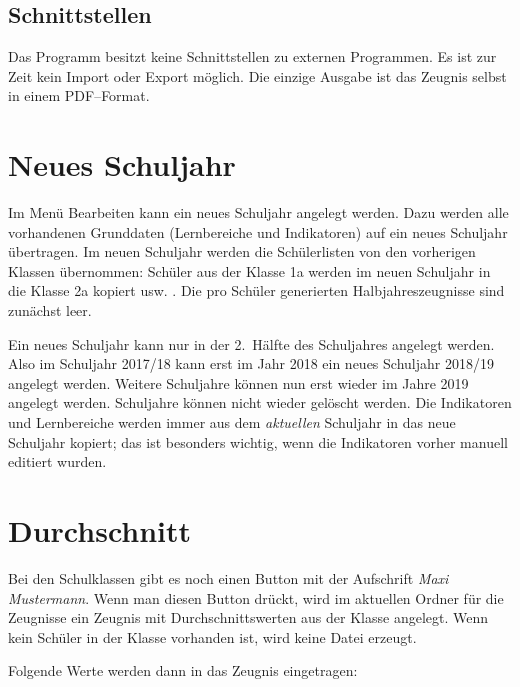 \documentclass[a4paper,notitlepage,parskip]{scrartcl}
\newcommand\ott{\normalfont\ttfamily}
\begin{document}
\subsection{Schnittstellen}
Das Programm besitzt keine Schnittstellen zu externen Programmen. Es ist zur Zeit kein Import oder Export möglich.
Die einzige Ausgabe ist das Zeugnis selbst in einem PDF--Format.

\section{Neues Schuljahr}
Im Menü {\ott Bearbeiten} kann ein neues Schuljahr angelegt werden. Dazu werden alle vorhandenen Grunddaten (Lernbereiche und Indikatoren) auf ein neues Schuljahr übertragen.
Im neuen Schuljahr werden die Schülerlisten von den vorherigen Klassen übernommen:
Schüler aus der Klasse 1a werden im neuen Schuljahr in die Klasse 2a kopiert usw. .
Die pro Schüler generierten Halbjahreszeugnisse sind zunächst leer.

Ein neues Schuljahr kann nur in der 2.~Hälfte des Schuljahres angelegt werden.
Also im Schuljahr 2017/18 kann erst im Jahr 2018 ein neues Schuljahr 2018/19 angelegt werden. Weitere Schuljahre können nun erst wieder im Jahre 2019 angelegt werden. Schuljahre können nicht wieder gelöscht werden.
Die Indikatoren und Lernbereiche werden immer aus dem \emph{aktuellen} Schuljahr in das neue Schuljahr kopiert; das ist besonders wichtig, wenn die Indikatoren vorher manuell editiert wurden.

\section{Durchschnitt}
Bei den Schulklassen gibt es noch einen Button mit der Aufschrift \emph{Maxi Mustermann}.
Wenn man diesen Button drückt, wird im aktuellen Ordner für die Zeugnisse ein Zeugnis mit Durchschnittswerten aus der Klasse angelegt. Wenn kein Schüler in der Klasse vorhanden ist, wird keine Datei erzeugt.

Folgende Werte werden dann in das Zeugnis eingetragen:
\end{document}

